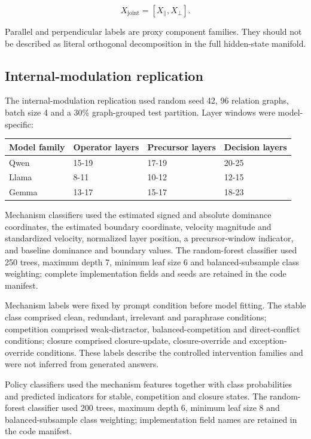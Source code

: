 \documentclass[11pt]{article}
\begin{document}
\begin{equation*}
X_{\mathrm{joint}}=\left[X_{\parallel},X_{\perp}\right].
\end{equation*}

Parallel and perpendicular labels are proxy component families. They should not be described as literal orthogonal decomposition in the full hidden-state manifold.

\subsection*{Internal-modulation replication}
The internal-modulation replication used random seed 42, 96 relation graphs, batch size 4 and a 30\% graph-grouped test partition. Layer windows were model-specific:

\begin{table}[H]
\centering\scriptsize\sloppy
\begin{tabularx}{\textwidth}{@{}XXXX@{}}
\toprule
Model family & Operator layers & Precursor layers & Decision layers \\
\midrule
Qwen & 15-19 & 17-19 & 20-25 \\
Llama & 8-11 & 10-12 & 12-15 \\
Gemma & 13-17 & 15-17 & 18-23 \\
\bottomrule
\end{tabularx}
\end{table}

Mechanism classifiers used the estimated signed and absolute dominance coordinates, the estimated boundary coordinate, velocity magnitude and standardized velocity, normalized layer position, a precursor-window indicator, and baseline dominance and boundary values. The random-forest classifier used 250 trees, maximum depth 7, minimum leaf size 6 and balanced-subsample class weighting; complete implementation fields and seeds are retained in the code manifest.

Mechanism labels were fixed by prompt condition before model fitting. The stable class comprised clean, redundant, irrelevant and paraphrase conditions; competition comprised weak-distractor, balanced-competition and direct-conflict conditions; closure comprised closure-update, closure-override and exception-override conditions. These labels describe the controlled intervention families and were not inferred from generated answers.

Policy classifiers used the mechanism features together with class probabilities and predicted indicators for stable, competition and closure states. The random-forest classifier used 200 trees, maximum depth 6, minimum leaf size 8 and balanced-subsample class weighting; implementation field names are retained in the code manifest.
\end{document}
